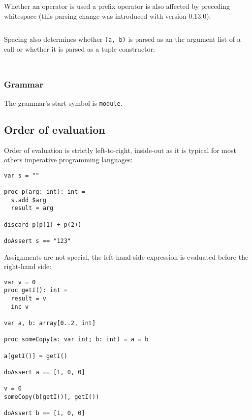 Whether an operator is used a prefix operator is also affected by
preceding whitespace (this parsing change was introduced with version
0.13.0):

\begin{verbatim}
\end{verbatim}

Spacing also determines whether \texttt{(a,\ b)} is parsed as an the
argument list of a call or whether it is parsed as a tuple constructor:

\begin{verbatim}
\end{verbatim}

\begin{verbatim}
\end{verbatim}

\hypertarget{grammar}{%
\subsubsection{Grammar}\label{grammar}}

The grammar's start symbol is \texttt{module}.

\hypertarget{order-of-evaluation}{%
\subsection{Order of evaluation}\label{order-of-evaluation}}

Order of evaluation is strictly left-to-right, inside-out as it is
typical for most others imperative programming languages:

\begin{verbatim}
var s = ""

proc p(arg: int): int =
  s.add $arg
  result = arg

discard p(p(1) + p(2))

doAssert s == "123"
\end{verbatim}

Assignments are not special, the left-hand-side expression is evaluated
before the right-hand side:

\begin{verbatim}
var v = 0
proc getI(): int =
  result = v
  inc v

var a, b: array[0..2, int]

proc someCopy(a: var int; b: int) = a = b

a[getI()] = getI()

doAssert a == [1, 0, 0]

v = 0
someCopy(b[getI()], getI())

doAssert b == [1, 0, 0]
\end{verbatim}

